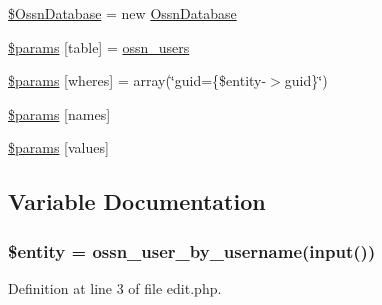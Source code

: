 \begin{DoxyCompactItemize}
\item 
\hyperlink{actions_2administrator_2user_2edit_8php_a8579dda900a1e2336bb710006263bc02}{\$\+Ossn\+Database} = new \hyperlink{class_ossn_database}{Ossn\+Database}
\item 
\hyperlink{actions_2administrator_2user_2edit_8php_a6d3a8e48e146c9e256cd43475253986e}{\$params} \mbox{[}\textquotesingle{}table\textquotesingle{}\mbox{]} = \textquotesingle{}\hyperlink{ossn_8lib_8users_8php_a4c158699e1dfdfb749ee3595f0d42866}{ossn\+\_\+users}\textquotesingle{}
\item 
\hyperlink{actions_2administrator_2user_2edit_8php_ac68e07fb8a2ea1d5eeef67f9502d9b8b}{\$params} \mbox{[}\textquotesingle{}wheres\textquotesingle{}\mbox{]} = array(\char`\"{}guid=\textquotesingle{}\{\$entity-\/$>$guid\}\textquotesingle{}\char`\"{})
\item 
\hyperlink{actions_2administrator_2user_2edit_8php_a67ec260a883c7da762004ba9e18899de}{\$params} \mbox{[}\textquotesingle{}names\textquotesingle{}\mbox{]}
\item 
\hyperlink{actions_2administrator_2user_2edit_8php_a18a54f0ab0c8d6c611f5ddfffc9a5e6f}{\$params} \mbox{[}\textquotesingle{}values\textquotesingle{}\mbox{]}
\end{DoxyCompactItemize}


\subsection{Variable Documentation}
\subsubsection[{\texorpdfstring{\$entity}{$entity}}]{\setlength{\rightskip}{0pt plus 5cm}\$entity = {\bf ossn\+\_\+user\+\_\+by\+\_\+username}({\bf input}(\textquotesingle{}))}\hypertarget{actions_2administrator_2user_2edit_8php_a74ed34e6d7bc9f3f8c4fb58a12247ee2}{}\label{actions_2administrator_2user_2edit_8php_a74ed34e6d7bc9f3f8c4fb58a12247ee2}


Definition at line 3 of file edit.\+php.

